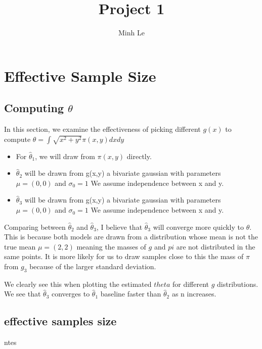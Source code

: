 \documentclass[12pt]{article}
\begin{document}
  
\title{Project 1}
\author{Minh Le}
\maketitle

\section{Effective Sample Size}
\subsection{Computing $\theta$}

In this section, we examine the effectiveness of picking different $g(x)$ to compute $\theta = \int \sqrt{x^2 + y^2}\pi(x,y)dxdy$ 

\begin{itemize}
  \item For $\hat{\theta}_1$, we will draw from $\pi(x,y)$ directly.
  
  \item $\hat{\theta}_2$ will be drawn from g(x,y) a bivariate gaussian with parameters $\mu = (0,0)$ and $\sigma_0 = 1$ We assume independence between x and y.
  
  \item $\hat{\theta}_3$ will be drawn from g(x,y) a bivariate gaussian with parameters $\mu = (0,0)$ and $\sigma_0 = 1$ We assume independence between x and y.
\end{itemize}

Comparing between $\hat{\theta}_2$ and $\hat{\theta}_3$, I believe that $\hat{\theta}_3$ will converge more quickly to $\theta$. This is because both models are drawn from a distribution whose mean is not the true mean $\mu=(2,2)$ meaning the masses of $g$ and $pi$ are not distributed in the same points. It is more likely for us to draw samples close to this the mass of $\pi$ from $g_3$ because of the larger standard deviation.  

We clearly see this when plotting the estimated $theta$ for different $g$ distributions. We see that $\hat{\theta}_3$ converges to $\hat{\theta}_1$ baseline faster than $\hat{\theta}_2$ as n increases.
  
	
\subsection{effective samples size}
	ntes
\end{document}
